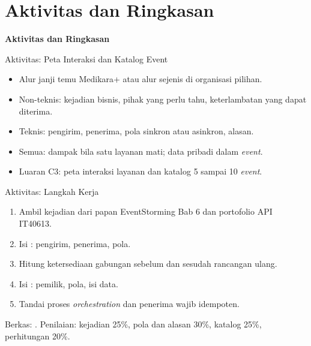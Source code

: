 \documentclass[aspectratio=169, table, 12pt]{beamer}
\begin{document}
\section{Aktivitas dan Ringkasan}

\begin{frame}{\hfill}
  \centering
  \Huge{\textbf{Aktivitas dan Ringkasan}}
\end{frame}

\begin{frame}{{\Large Aktivitas: Peta Interaksi dan Katalog Event}}
  \vspace{6pt}
  \begin{itemize}
    \item Alur janji temu Medikara+ atau alur sejenis di organisasi pilihan.
    \item Non-teknis: kejadian bisnis, pihak yang perlu tahu, keterlambatan
          yang dapat diterima.
    \item Teknis: pengirim, penerima, pola sinkron atau asinkron, alasan.
    \item Semua: dampak bila satu layanan mati; data pribadi dalam
          \textit{event}.
    \item Luaran C3: peta interaksi layanan dan katalog 5 sampai 10
          \textit{event}.
  \end{itemize}
\end{frame}

\begin{frame}{{\Large Aktivitas: Langkah Kerja}}
  \vspace{4pt}
  \small
  \begin{enumerate}
    \item Ambil kejadian dari papan EventStorming Bab 6 dan portofolio API
          IT40613.
    \item Isi : pengirim, penerima, pola.
    \item Hitung ketersediaan gabungan sebelum dan sesudah rancangan ulang.
    \item Isi : pemilik, pola, isi data.
    \item Tandai proses \textit{orchestration} dan penerima wajib idempoten.
  \end{enumerate}
  \vspace{4pt}
  {\footnotesize Berkas: . Penilaian: kejadian 25\%,
  pola dan alasan 30\%, katalog 25\%, perhitungan 20\%.}
\end{frame}
\end{document}
